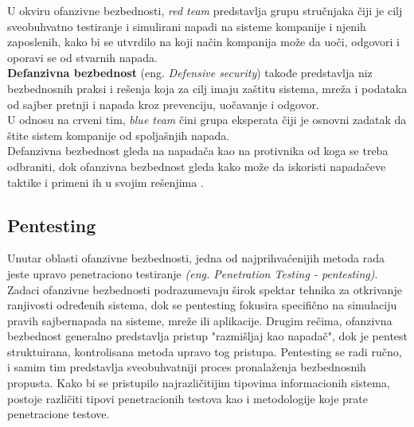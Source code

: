 \documentclass[a4paper,12pt]{article}
\begin{document}
U okviru ofanzivne bezbednosti, \textit{red team} \cite{redblue} predstavlja grupu stručnjaka čiji je cilj sveobuhvatno testiranje i simulirani napadi na sisteme kompanije i njenih zaposlenih, kako bi se utvrdilo na koji način kompanija može da uoči, odgovori i oporavi se od stvarnih napada.
\\

\textbf{Defanzivna bezbednost} (eng. \textit{Defensive security}) takođe predstavlja niz bezbednosnih praksi i rešenja koja za cilj imaju zaštitu sistema, mreža i podataka od sajber pretnji i napada kroz prevenciju, uočavanje i odgovor. \\
U odnosu na crveni tim, \textit{blue team} \cite{redblue} čini grupa eksperata čiji je osnovni zadatak da štite sistem kompanije od spoljašnjih napada.\\


Defanzivna bezbednost gleda na napadača kao na protivnika od koga se treba odbraniti, dok ofanzivna bezbednost gleda kako može da iskoristi napadačeve taktike i primeni ih u svojim rešenjima \cite{defensive_security}.


\subsection{Pentesting}
Unutar oblasti ofanzivne bezbednosti, jedna od najprihvaćenijih metoda rada jeste upravo penetraciono testiranje  \textit{(eng. Penetration Testing - pentesting)}. Zadaci ofanzivne bezbednosti podrazumevaju širok spektar tehnika za otkrivanje ranjivosti određenih sistema, dok se pentesting fokusira specifično na simulaciju pravih sajbernapada na sisteme, mreže ili aplikacije. Drugim rečima, ofanzivna bezbednost generalno predstavlja pristup "razmišljaj kao napadač", dok je pentest struktuirana, kontrolisana metoda upravo tog pristupa.
Pentesting se radi ručno, i samim tim predstavlja sveobuhvatniji proces pronalaženja bezbednosnih propusta.
Kako bi se pristupilo najrazličitijim tipovima informacionih sistema, postoje različiti tipovi penetracionih testova kao i metodologije koje prate penetracione testove. \\
\end{document}
